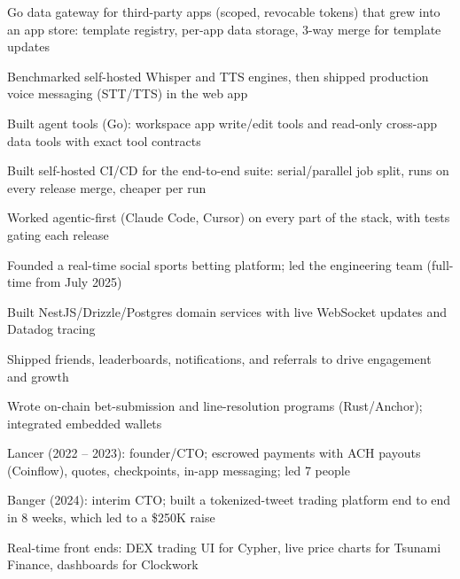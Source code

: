 \documentclass[print]{jack-resume}
\begin{document}
\begin{tightemize}
    \item Go data gateway for third-party apps (scoped, revocable tokens) that grew into an app store: template registry, per-app data storage, 3-way merge for template updates
    \item Benchmarked self-hosted Whisper and TTS engines, then shipped production voice messaging (STT/TTS) in the web app
    \item Built agent tools (Go): workspace app write/edit tools and read-only cross-app data tools with exact tool contracts
    \item Built self-hosted CI/CD for the end-to-end suite: serial/parallel job split, runs on every release merge, cheaper per run
    \item Worked agentic-first (Claude Code, Cursor) on every part of the stack, with tests gating each release
\end{tightemize}
\sectionsep

\begin{tightemize}
    \item Founded a real-time social sports betting platform; led the engineering team (full-time from July 2025)
    \item Built NestJS/Drizzle/Postgres domain services with live WebSocket updates and Datadog tracing
    \item Shipped friends, leaderboards, notifications, and referrals to drive engagement and growth
    \item Wrote on-chain bet-submission and line-resolution programs (Rust/Anchor); integrated embedded wallets
\end{tightemize}
\sectionsep

\begin{tightemize}
    \item Lancer (2022 -- 2023): founder/CTO; escrowed payments with ACH payouts (Coinflow), quotes, checkpoints, in-app messaging; led 7 people
    \item Banger (2024): interim CTO; built a tokenized-tweet trading platform end to end in 8 weeks, which led to a \$250K raise
    \item Real-time front ends: DEX trading UI for Cypher, live price charts for Tsunami Finance, dashboards for Clockwork
\end{tightemize}
\sectionsep
\end{document}
